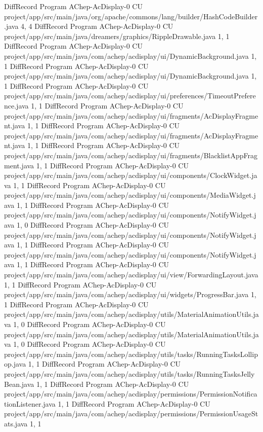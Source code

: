 DiffRecord Program AChep-AcDisplay-0 CU project/app/src/main/java/org/apache/commons/lang/builder/HashCodeBuilder.java  {4, 4}
DiffRecord Program AChep-AcDisplay-0 CU project/app/src/main/java/dreamers/graphics/RippleDrawable.java  {1, 1}
DiffRecord Program AChep-AcDisplay-0 CU project/app/src/main/java/com/achep/acdisplay/ui/DynamicBackground.java  {1, 1}
DiffRecord Program AChep-AcDisplay-0 CU project/app/src/main/java/com/achep/acdisplay/ui/DynamicBackground.java  {1, 1}
DiffRecord Program AChep-AcDisplay-0 CU project/app/src/main/java/com/achep/acdisplay/ui/preferences/TimeoutPreference.java  {1, 1}
DiffRecord Program AChep-AcDisplay-0 CU project/app/src/main/java/com/achep/acdisplay/ui/fragments/AcDisplayFragment.java  {1, 1}
DiffRecord Program AChep-AcDisplay-0 CU project/app/src/main/java/com/achep/acdisplay/ui/fragments/AcDisplayFragment.java  {1, 1}
DiffRecord Program AChep-AcDisplay-0 CU project/app/src/main/java/com/achep/acdisplay/ui/fragments/BlacklistAppFragment.java  {1, 1}
DiffRecord Program AChep-AcDisplay-0 CU project/app/src/main/java/com/achep/acdisplay/ui/components/ClockWidget.java  {1, 1}
DiffRecord Program AChep-AcDisplay-0 CU project/app/src/main/java/com/achep/acdisplay/ui/components/MediaWidget.java  {1, 1}
DiffRecord Program AChep-AcDisplay-0 CU project/app/src/main/java/com/achep/acdisplay/ui/components/NotifyWidget.java  {1, 0}
DiffRecord Program AChep-AcDisplay-0 CU project/app/src/main/java/com/achep/acdisplay/ui/components/NotifyWidget.java  {1, 1}
DiffRecord Program AChep-AcDisplay-0 CU project/app/src/main/java/com/achep/acdisplay/ui/components/NotifyWidget.java  {1, 1}
DiffRecord Program AChep-AcDisplay-0 CU project/app/src/main/java/com/achep/acdisplay/ui/view/ForwardingLayout.java  {1, 1}
DiffRecord Program AChep-AcDisplay-0 CU project/app/src/main/java/com/achep/acdisplay/ui/widgets/ProgressBar.java  {1, 1}
DiffRecord Program AChep-AcDisplay-0 CU project/app/src/main/java/com/achep/acdisplay/utils/MaterialAnimationUtils.java  {1, 0}
DiffRecord Program AChep-AcDisplay-0 CU project/app/src/main/java/com/achep/acdisplay/utils/MaterialAnimationUtils.java  {1, 0}
DiffRecord Program AChep-AcDisplay-0 CU project/app/src/main/java/com/achep/acdisplay/utils/tasks/RunningTasksLollipop.java  {1, 1}
DiffRecord Program AChep-AcDisplay-0 CU project/app/src/main/java/com/achep/acdisplay/utils/tasks/RunningTasksJellyBean.java  {1, 1}
DiffRecord Program AChep-AcDisplay-0 CU project/app/src/main/java/com/achep/acdisplay/permissions/PermissionNotificationListener.java  {1, 1}
DiffRecord Program AChep-AcDisplay-0 CU project/app/src/main/java/com/achep/acdisplay/permissions/PermissionUsageStats.java  {1, 1}
